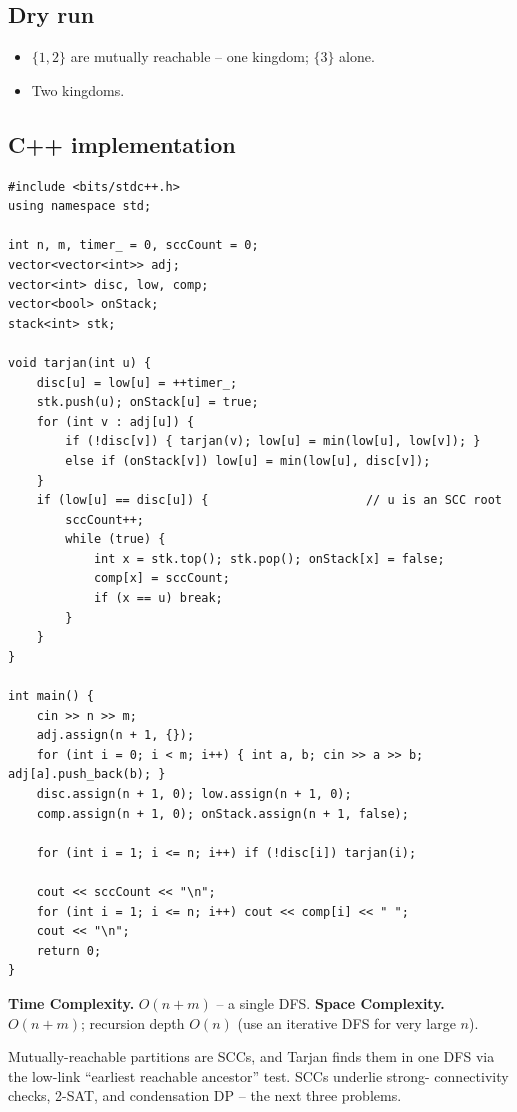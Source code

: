 \subsection*{Dry run}


\begin{itemize}
  \item $\{1,2\}$ are mutually reachable -- one kingdom; $\{3\}$ alone.
  \item Two kingdoms.
\end{itemize}

\subsection*{C++ implementation}

\begin{lstlisting}
#include <bits/stdc++.h>
using namespace std;

int n, m, timer_ = 0, sccCount = 0;
vector<vector<int>> adj;
vector<int> disc, low, comp;
vector<bool> onStack;
stack<int> stk;

void tarjan(int u) {
    disc[u] = low[u] = ++timer_;
    stk.push(u); onStack[u] = true;
    for (int v : adj[u]) {
        if (!disc[v]) { tarjan(v); low[u] = min(low[u], low[v]); }
        else if (onStack[v]) low[u] = min(low[u], disc[v]);
    }
    if (low[u] == disc[u]) {                      // u is an SCC root
        sccCount++;
        while (true) {
            int x = stk.top(); stk.pop(); onStack[x] = false;
            comp[x] = sccCount;
            if (x == u) break;
        }
    }
}

int main() {
    cin >> n >> m;
    adj.assign(n + 1, {});
    for (int i = 0; i < m; i++) { int a, b; cin >> a >> b; adj[a].push_back(b); }
    disc.assign(n + 1, 0); low.assign(n + 1, 0);
    comp.assign(n + 1, 0); onStack.assign(n + 1, false);

    for (int i = 1; i <= n; i++) if (!disc[i]) tarjan(i);

    cout << sccCount << "\n";
    for (int i = 1; i <= n; i++) cout << comp[i] << " ";
    cout << "\n";
    return 0;
}
\end{lstlisting}

\begin{complexitybox}
\textbf{Time Complexity.} $O(n+m)$ -- a single DFS. \textbf{Space
Complexity.} $O(n+m)$; recursion depth $O(n)$ (use an iterative DFS for very
large $n$).
\end{complexitybox}

\begin{takeawaybox}
Mutually-reachable partitions are SCCs, and Tarjan finds them in one DFS via
the low-link ``earliest reachable ancestor'' test. SCCs underlie strong-
connectivity checks, 2-SAT, and condensation DP -- the next three problems.
\end{takeawaybox}
